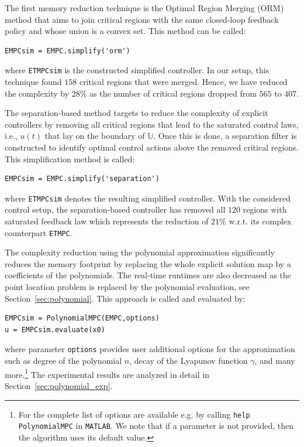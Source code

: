 \documentclass[letterpaper, 10 pt, conference]{ieeeconf}
\newcommand{\polydegree}{n}
\begin{document}
The first memory reduction technique is the Optimal Region Merging (ORM) method that aims to join critical regions with the same closed-loop feedback policy and whose union is a convex set. This method can be called: 
\begin{verbatim}
EMPCsim = EMPC.simplify('orm')
\end{verbatim}
where \verb|ETMPCsim| is the constructed simplified controller. In our setup, this technique found $158$ critical regions that were merged. Hence, we have reduced the complexity by $28\%$ as the number of critical regions dropped from $565$ to $407$. 

%
%
The separation-based method targets to reduce the complexity of explicit controllers by removing all critical regions that lead to the saturated control laws, i.e., $u(t)$ that lay on the boundary of $\mathbb{U}$. Once this is done, a separation filter is constructed to identify optimal control actions above the removed critical regions. This simplification method is called:
\begin{verbatim}
EMPCsim = EMPC.simplify('separation')
\end{verbatim}
where \verb|ETMPCsim| denotes the resulting simplified controller. With the considered control setup, the separation-based controller has removed all $120$ regions with saturated feedback law which represents the reduction of $21\%$ w.r.t. its complex counterpart \verb|ETMPC|.

The complexity reduction using the polynomial approximation significantly reduces the memory footprint by replacing the whole explicit solution map by a coefficients of the polynomials. The real-time runtimes are also decreased as the point location problem is replaced by the polynomial evaluation, see Section~\ref{sec:polynomial}. This approach is called and evaluated by:
\begin{verbatim}
EMPCsim = PolynomialMPC(EMPC,options)
u = EMPCsim.evaluate(x0)
\end{verbatim}
where parameter \verb|options| provides user additional options for the approximation such as degree of the polynomial $\polydegree$, decay of the Lyapunov function $\gamma$, and many more.\footnote{For the complete list of options are available e.g. by calling \texttt{help PolynomialMPC} in \texttt{MATLAB}. We note that if a parameter is not provided, then the algorithm uses its default value.}
The experimental results are analyzed in detail in Section~\ref{sec:polynomial_exp}.
\end{document}
